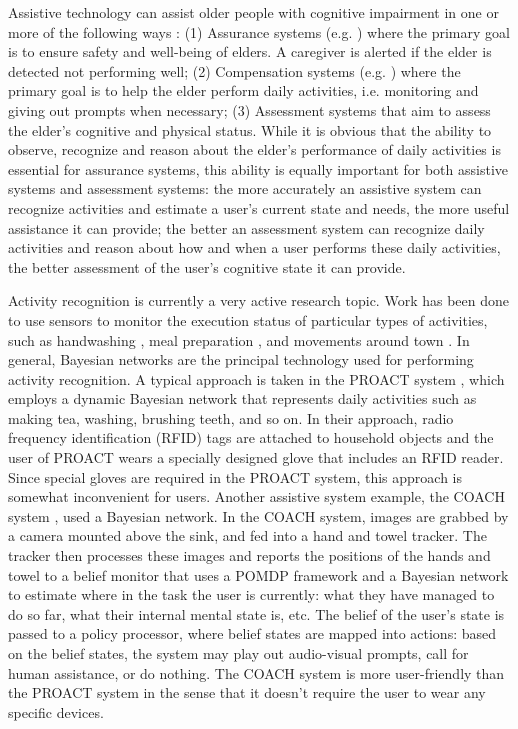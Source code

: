 Assistive technology can assist older people with cognitive impairment in one or more of the following ways \cite{pollack2005intelligent}: (1) Assurance systems (e.g. \cite{hoey2012lacasa}) where the primary goal is to ensure safety and well-being of elders. A caregiver is alerted if the elder is detected not performing well; (2) Compensation systems (e.g. \cite{boger2005decision, peters2014automatic, hoey2010automated}) where the primary goal is to help the elder perform daily activities, i.e. monitoring and giving out prompts when necessary; (3) Assessment systems that aim to assess the elder's cognitive and physical status. While it is obvious that the ability to observe, recognize and reason about the elder's performance of daily activities is essential for assurance systems, this ability is equally important for both assistive systems and assessment systems: the more accurately an assistive system can recognize activities and estimate a user's current state and needs, the more useful assistance it can provide; the better an assessment system can recognize daily activities and reason about how and when a user performs these daily activities, the better assessment of the user's cognitive state it can provide.

Activity recognition is currently a very active research topic. Work has been done to use sensors to monitor the execution status of particular types of activities, such as handwashing \cite{hoey2010automated}, meal preparation \cite{philipose2004inferring}, and movements around town \cite{hoey2012lacasa}. In general, Bayesian networks are the principal technology used for performing activity recognition. A typical approach is taken in the PROACT system \cite{philipose2004inferring}, which employs a dynamic Bayesian network that represents daily activities such as making tea, washing, brushing teeth, and so on. In their approach, radio frequency identification (RFID) tags are attached to household objects and the user of PROACT wears a specially designed glove that includes an RFID reader. Since special gloves are required in the PROACT system, this approach is somewhat inconvenient for users. Another assistive system example, the COACH system \cite{boger2005decision, hoey2010automated}, used a Bayesian network. In the COACH system, images are grabbed by a camera mounted above the sink, and fed into a hand and towel tracker. The tracker then processes these images and reports the positions of the hands and towel to a belief monitor that uses a POMDP framework and a Bayesian network to estimate where in the task the user is currently: what they have managed to do so far, what their internal mental state is, etc. The belief of the user's state is passed to a policy processor, where belief states are mapped into actions: based on the belief states, the system may play out audio-visual prompts, call for human assistance, or do nothing. The COACH system is more user-friendly than the PROACT system in the sense that it doesn't require the user to wear any specific devices.

